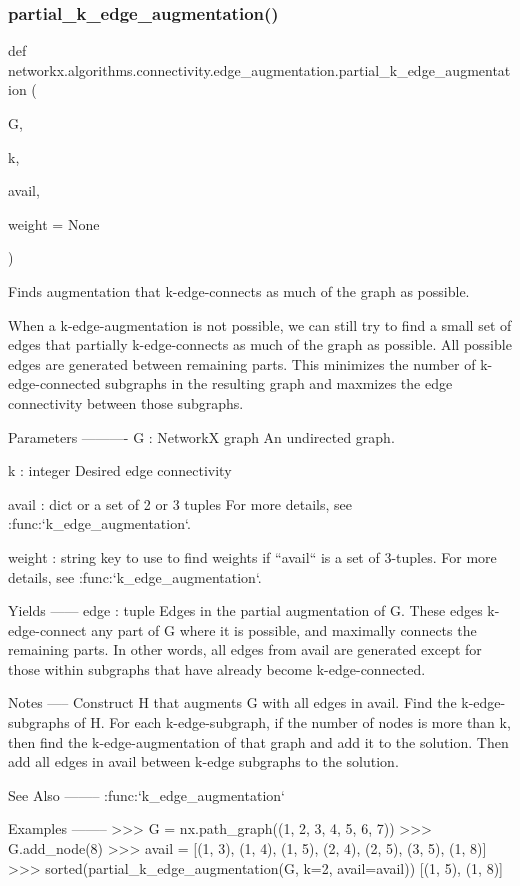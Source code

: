 \subsubsection{\texorpdfstring{partial\+\_\+k\+\_\+edge\+\_\+augmentation()}{partial\_k\_edge\_augmentation()}}
{\footnotesize\ttfamily def networkx.\+algorithms.\+connectivity.\+edge\+\_\+augmentation.\+partial\+\_\+k\+\_\+edge\+\_\+augmentation (\begin{DoxyParamCaption}\item[{}]{G,  }\item[{}]{k,  }\item[{}]{avail,  }\item[{}]{weight = {\ttfamily None} }\end{DoxyParamCaption})}

\begin{DoxyVerb}Finds augmentation that k-edge-connects as much of the graph as possible.

When a k-edge-augmentation is not possible, we can still try to find a
small set of edges that partially k-edge-connects as much of the graph as
possible. All possible edges are generated between remaining parts.
This minimizes the number of k-edge-connected subgraphs in the resulting
graph and maxmizes the edge connectivity between those subgraphs.

Parameters
----------
G : NetworkX graph
   An undirected graph.

k : integer
    Desired edge connectivity

avail : dict or a set of 2 or 3 tuples
    For more details, see :func:`k_edge_augmentation`.

weight : string
    key to use to find weights if ``avail`` is a set of 3-tuples.
    For more details, see :func:`k_edge_augmentation`.

Yields
------
edge : tuple
    Edges in the partial augmentation of G. These edges k-edge-connect any
    part of G where it is possible, and maximally connects the remaining
    parts. In other words, all edges from avail are generated except for
    those within subgraphs that have already become k-edge-connected.

Notes
-----
Construct H that augments G with all edges in avail.
Find the k-edge-subgraphs of H.
For each k-edge-subgraph, if the number of nodes is more than k, then find
the k-edge-augmentation of that graph and add it to the solution. Then add
all edges in avail between k-edge subgraphs to the solution.

See Also
--------
:func:`k_edge_augmentation`

Examples
--------
>>> G = nx.path_graph((1, 2, 3, 4, 5, 6, 7))
>>> G.add_node(8)
>>> avail = [(1, 3), (1, 4), (1, 5), (2, 4), (2, 5), (3, 5), (1, 8)]
>>> sorted(partial_k_edge_augmentation(G, k=2, avail=avail))
[(1, 5), (1, 8)]
\end{DoxyVerb}
